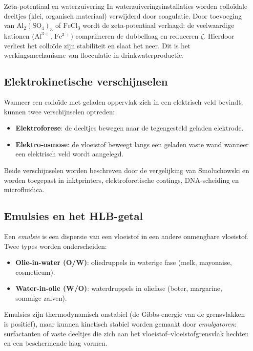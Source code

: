 \begin{voorbeeld}{Zeta-potentiaal en waterzuivering}
In waterzuiveringsinstallaties worden collo\"idale deeltjes (klei, organisch materiaal) verwijderd door coagulatie. Door toevoeging van $\mathrm{Al_2(SO_4)_3}$ of $\mathrm{FeCl_3}$ wordt de zeta-potentiaal verlaagd: de veelwaardige kationen ($\mathrm{Al^{3+}}$, $\mathrm{Fe^{3+}}$) comprimeren de dubbellaag en reduceren $\zeta$. Hierdoor verliest het collo\"ide zijn stabiliteit en slaat het neer. Dit is het werkingsmechanisme van flocculatie in drinkwaterproductie.
\end{voorbeeld}

\subsection{Elektrokinetische verschijnselen}

Wanneer een collo\"ide met geladen oppervlak zich in een elektrisch veld bevindt, kunnen twee verschijnselen optreden:
\begin{itemize}
\item \textbf{Elektroforese}: de deeltjes bewegen naar de tegengesteld geladen elektrode.
\item \textbf{Elektro-osmose}: de vloeistof beweegt langs een geladen vaste wand wanneer een elektrisch veld wordt aangelegd.
\end{itemize}
Beide verschijnselen worden beschreven door de vergelijking van Smoluchowski en worden toegepast in inktprinters, elektroforetische coatings, DNA-scheiding en microfluidica.

\subsection{Emulsies en het HLB-getal}
\label{sec:emulsies}

Een \emph{emulsie} is een dispersie van een vloeistof in een andere onmengbare vloeistof. Twee types worden onderscheiden:
\begin{itemize}
\item \textbf{Olie-in-water (O/W)}: oliedruppels in waterige fase (melk, mayonaise, cosmeticum).
\item \textbf{Water-in-olie (W/O)}: waterdruppels in oliefase (boter, margarine, sommige zalven).
\end{itemize}
Emulsies zijn thermodynamisch onstabiel (de Gibbs-energie van de grensvlakken is positief), maar kunnen kinetisch stabiel worden gemaakt door \emph{emulgatoren}: surfactanten of vaste deeltjes die zich aan het vloeistof--vloeistofgrensvlak hechten en een beschermende laag vormen.

